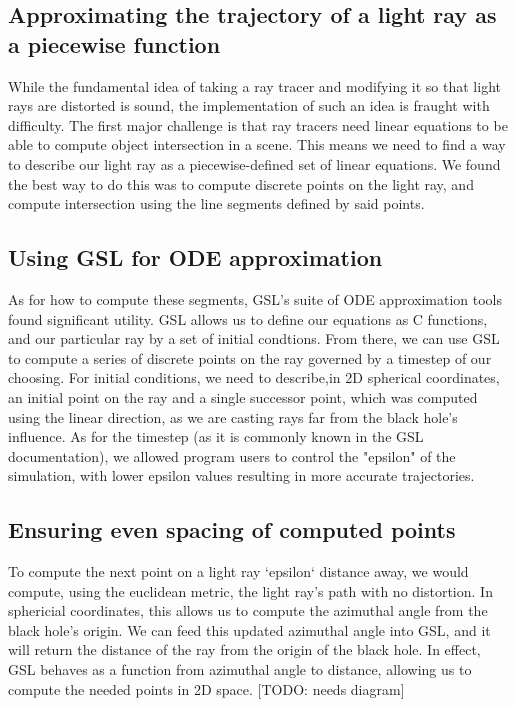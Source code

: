 \subsection {Approximating the trajectory of a light ray as a piecewise function}
While the fundamental idea of taking a ray tracer and modifying it so that light rays are distorted is sound, the implementation of such an idea is fraught with difficulty. The first major challenge is that ray tracers need linear equations to be able to compute object intersection in a scene. This means we need to find a way to describe our light ray as a piecewise-defined set of linear equations. We found the best way to do this was to compute discrete points on the light ray, and compute intersection using the line segments defined by said points. 

\subsection {Using GSL for ODE approximation}
As for how to compute these segments, GSL's suite of ODE approximation tools found significant utility. GSL allows us to define our equations as C functions, and our particular ray by a set of initial condtions. From there, we can use GSL to compute a series of discrete points on the ray governed by a timestep of our choosing. For initial conditions, we need to describe,in 2D spherical coordinates, an initial point on the ray and a single successor point, which was computed using the linear direction, as we are casting rays far from the black hole's influence. As for the timestep (as it is commonly known in the GSL documentation), we allowed program users to control the "epsilon" of the simulation, with lower epsilon values resulting in more accurate trajectories. 

\subsection {Ensuring even spacing of computed points}
To compute the next point on a light ray `epsilon` distance away, we would compute, using the euclidean metric, the light ray's path with no distortion. In sphericial coordinates, this allows us to compute the azimuthal angle from the black hole's origin. We can feed this updated azimuthal angle into GSL, and it will return the distance of the ray from the origin of the black hole. In effect, GSL behaves as a function from azimuthal angle to distance, allowing us to compute the needed points in 2D space.  [TODO: needs diagram]


